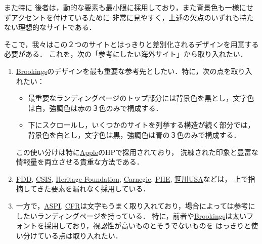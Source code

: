 \documentclass[uplatex,dvipdfmx]{jsarticle}
\begin{document}
\begin{example}[差別化したいところの日本サイト]
\begin{enumerate}
        また特に
        後者は，動的な要素も最小限に採用しており，また背景色も一様にせずアクセントを付けているために
        非常に見やすく，上述の欠点のいずれも持たない理想的なサイトである．
    \end{enumerate}
    そこで，我々はこの２つのサイトとはっきりと差別化されるデザインを用意する必要がある．
    これを，次の「参考にしたい海外サイト」から取り入れたい．
\end{example}

\begin{example}[参考にしたい海外サイト]\mbox{}\label{exp-abroad}
    \begin{enumerate}
        \item \href{https://www.brookings.edu/}{Brookings}のデザインを最も重要な参考先としたい．特に，次の点を取り入れたい：
        \begin{itemize}
            \item 最重要なランディングページのトップ部分には背景色を黒とし，文字色は白，強調色は赤の３色のみで構成する．
            \item 下にスクロールし，いくつかのサイトを列挙する構造が続く部分では，背景色を白とし，文字色は黒，強調色は青の３色のみで構成する．
        \end{itemize}
        この使い分けは特に\href{https://www.apple.com/jp/mac/}{Apple}のHPで採用されており，
        洗練された印象と豊富な情報量を両立させる貴重な方法である．
        \item \href{http://www.defenddemocracy.org/}{FDD}, 
        \href{https://www.csis.org/}{CSIS}, 
        \href{https://www.heritage.org/}{Heritage Foundation}, 
        \href{https://carnegieendowment.org/}{Carnegie}, 
        \href{https://www.piie.com/}{PIIE}, 
        \href{https://spfusa.org/}{笹川USA}などは，
        上で指摘してきた要素を漏れなく採用している．
        \item 一方で，\href{https://www.aspi.org.au/}{ASPI}, 
        \href{https://www.cfr.org/}{CFR}は文字もうまく取り入れており，場合によっては参考にしたいランディングページを持っている．
        特に，前者や\href{https://www.brookings.edu/}{Brookings}は太いフォントを採用しており，視認性が高いものとそうでないものを
        はっきりと使い分けている点は取り入れたい．
    \end{enumerate}
\end{example}
\end{document}
